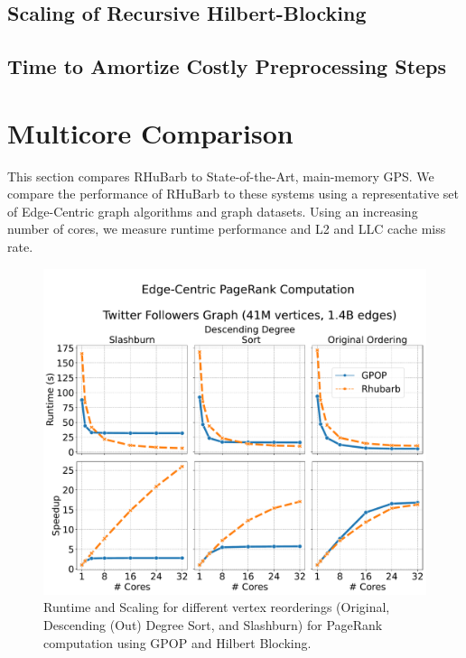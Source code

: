 \subsection{Scaling of Recursive Hilbert-Blocking}
\subsection{Time to Amortize Costly Preprocessing Steps}
\section{Multicore Comparison} \label{sec:multicore}
This section compares RHuBarb to State-of-the-Art, main-memory GPS.
We compare the performance of RHuBarb to these systems using a representative set of Edge-Centric graph algorithms and graph datasets. Using an increasing number of cores, we measure runtime performance and L2 and LLC cache miss rate.

\begin{figure}[!htb]
    \centering
    \includegraphics[width=5in]{../plots/eval/twitter-sample.pdf}
    \caption{Runtime and Scaling for different vertex reorderings (Original, Descending (Out) Degree Sort, and  Slashburn) for PageRank computation using GPOP and Hilbert Blocking.}
    \label{fig:eval-sample}   %
    \end{figure}

